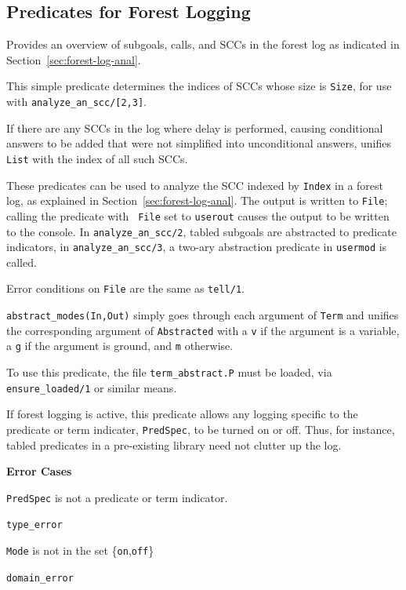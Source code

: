 \subsection{Predicates for Forest Logging}

\begin{description}
%
Provides an overview of subgoals, calls, and SCCs in the forest log as
indicated in Section~\ref{sec:forest-log-anal}.

%
This simple predicate determines the indices of SCCs whose size is
{\tt Size}, for use with {\tt analyze\_an\_scc/[2,3]}.

%
If there are any SCCs in the log where delay is performed, causing
conditional answers to be added that were not simplified into
unconditional answers, unifies {\tt List} with the index of all such
SCCs.

%
These predicates can be used to analyze the SCC indexed by {\tt Index}
in a forest log, as explained in Section~\ref{sec:forest-log-anal}.
The output is written to {\tt File}; calling the predicate with {\tt
  File} set to {\tt userout} causes the output to be written to the
console.  In {\tt analyze\_an\_scc/2}, tabled subgoals are abstracted
to predicate indicators, in {\tt analyze\_an\_scc/3}, a two-ary
abstraction predicate in {\tt usermod} is called.

Error conditions on {\tt File} are the same as {\tt tell/1}.

%
{\tt abstract\_modes(In,Out)} simply goes through each argument of
{\tt Term} and unifies the corresponding argument of {\tt Abstracted}
with a {\tt v} if the argument is a variable, a {\tt g} if the
argument is ground, and {\tt m} otherwise.

To use this predicate, the file {\tt term\_abstract.P} must be loaded,
via {\tt ensure\_loaded/1} or similar means.

If forest logging is active, this predicate allows any logging
specific to the predicate or term indicater, {\tt PredSpec}, to be
turned on or off.  Thus, for instance, tabled predicates in a
pre-existing library need not clutter up the log.

{\bf Error Cases}
\bi
\item 	{\tt PredSpec} is not a predicate or term indicator.
\bi
\item 	{\tt type\_error}
\ei
%
\item 	{\tt Mode} is not in the set \{{\tt on},{\tt off}\}
\bi
\item 	{\tt domain\_error}
\ei
\ei
\end{description}



